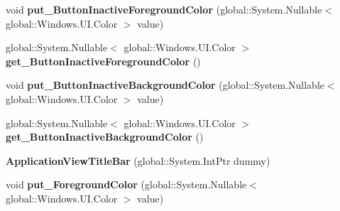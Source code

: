 \begin{DoxyCompactItemize}
\item 
\mbox{\label{class_windows_1_1_u_i_1_1_view_management_1_1_application_view_title_bar_a24fc97928a847870e480f914ee47dfb5}} 
void {\bfseries put\+\_\+\+Button\+Inactive\+Foreground\+Color} (global\+::\+System.\+Nullable$<$ global\+::\+Windows.\+U\+I.\+Color $>$ value)
\item 
\mbox{\label{class_windows_1_1_u_i_1_1_view_management_1_1_application_view_title_bar_a4921101b9d4e1bf1aaadc876b4855657}} 
global\+::\+System.\+Nullable$<$ global\+::\+Windows.\+U\+I.\+Color $>$ {\bfseries get\+\_\+\+Button\+Inactive\+Foreground\+Color} ()
\item 
\mbox{\label{class_windows_1_1_u_i_1_1_view_management_1_1_application_view_title_bar_a61074bacb31ca090b2114fcd7d61167b}} 
void {\bfseries put\+\_\+\+Button\+Inactive\+Background\+Color} (global\+::\+System.\+Nullable$<$ global\+::\+Windows.\+U\+I.\+Color $>$ value)
\item 
\mbox{\label{class_windows_1_1_u_i_1_1_view_management_1_1_application_view_title_bar_abafef7d0cebc7bdecdff70332dd6c825}} 
global\+::\+System.\+Nullable$<$ global\+::\+Windows.\+U\+I.\+Color $>$ {\bfseries get\+\_\+\+Button\+Inactive\+Background\+Color} ()
\item 
\mbox{\label{class_windows_1_1_u_i_1_1_view_management_1_1_application_view_title_bar_a4b9382135e40d19c25f0633e1eea3e67}} 
{\bfseries Application\+View\+Title\+Bar} (global\+::\+System.\+Int\+Ptr dummy)
\item 
\mbox{\label{class_windows_1_1_u_i_1_1_view_management_1_1_application_view_title_bar_a32a06dddb589fcc84b37bbb52d2fef56}} 
void {\bfseries put\+\_\+\+Foreground\+Color} (global\+::\+System.\+Nullable$<$ global\+::\+Windows.\+U\+I.\+Color $>$ value)
\item 
\mbox{\label{class_windows_1_1_u_i_1_1_view_management_1_1_application_view_title_bar_a0100947ed3af490212e529dba4a068e8}} 

\end{DoxyCompactItemize}
